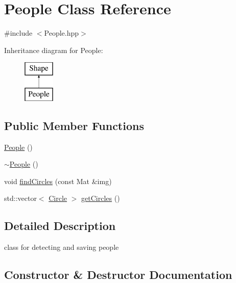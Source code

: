 \hypertarget{class_people}{}\section{People Class Reference}
\label{class_people}


{\ttfamily \#include $<$People.\+hpp$>$}

Inheritance diagram for People\+:\begin{figure}[H]
\begin{center}
\leavevmode
\includegraphics[height=2.000000cm]{class_people}
\end{center}
\end{figure}
\subsection*{Public Member Functions}
\begin{DoxyCompactItemize}
\item 
\mbox{\hyperlink{class_people_aae1408eddfd15a5007003ecdf1507941}{People}} ()
\item 
\mbox{\hyperlink{class_people_adae124857f64dadff4e1801410b3dab2}{$\sim$\+People}} ()
\item 
void \mbox{\hyperlink{class_people_a4c13aebe88654dba21a2a12b8b5943f7}{find\+Circles}} (const Mat \&img)
\item 
std\+::vector$<$ \mbox{\hyperlink{class_circle}{Circle}} $>$ \mbox{\hyperlink{class_people_a0fc4e671ff110314dc0dc65ee150f04c}{get\+Circles}} ()
\end{DoxyCompactItemize}


\subsection{Detailed Description}
class for detecting and saving people 

\subsection{Constructor \& Destructor Documentation}
\mbox{\label{class_people_aae1408eddfd15a5007003ecdf1507941}} 

